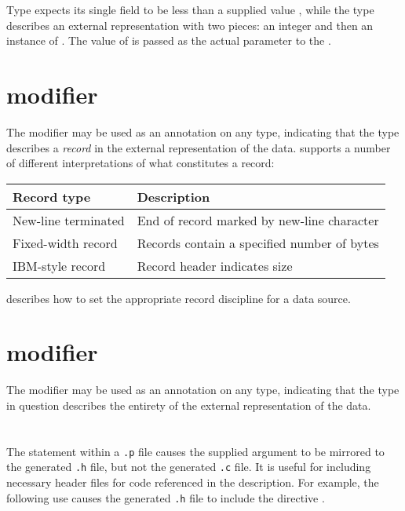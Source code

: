 %
\noindent
Type  expects its single field  to be
less than a supplied value , while the type 
describes an external representation with two pieces: an integer
 and then an instance of .  The value
of  is passed as the actual parameter to the 
\pstruct{}. 

\section{\Precord{} modifier}
\label{sec:common-precord}
The \Precord{} modifier may be used as an annotation on any \pads{}
type, indicating that the type describes a \textit{record} in the
external representation of the data.  \pads{} supports a number of
different interpretations of what constitutes a record:

\begin{center}
\begin{tabular}{l|l}
Record type         & Description\\ \hline
New-line terminated & End of record marked by new-line character\\
Fixed-width record  & Records contain a specified number of bytes\\
IBM-style record    & Record header indicates size\\
\end{tabular}
\end{center}

\noindent
{} describes how
to set the appropriate record discipline for a data source. 


\section{\Psource{} modifier}
\label{sec:common-pfile}
The \Psource{} modifier may be used as an annotation on any \pads{}
type, indicating that the type in question describes the entirety of
the external representation of the data.


\section{\Pinclude{}}
The \Pinclude{} statement within a \texttt{.p} file causes the supplied
argument to be mirrored to the generated \texttt{.h} file, but not the
generated \texttt{.c} file.  It is useful for including necessary
header files for \C{} code referenced in the \pads{} description.  For
example, the following use causes the generated \texttt{.h} file to
include the directive . 

